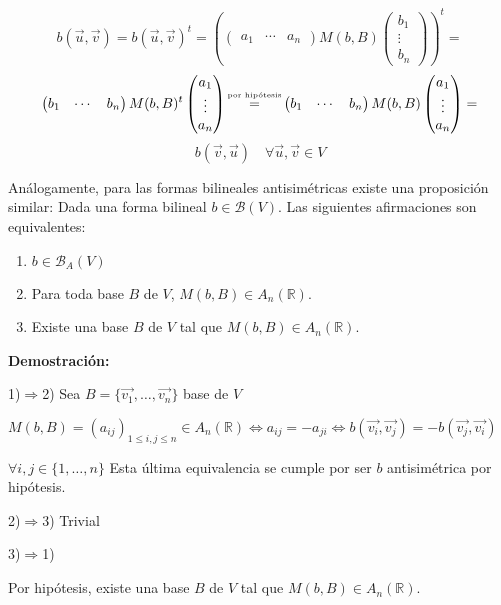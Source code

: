 \documentclass[x11names,table]{report}
\begin{document}
\[b(\vec{u},\vec{v})=b(\vec{u},\vec{v})^t=\left(\begin{pmatrix}
a_1 & \cdots & a_n
\end{pmatrix}M(b,B)\begin{pmatrix}
b_1 \\ \vdots \\ b_n
\end{pmatrix}\right)^t=\]\[\begin{pmatrix}
b_1 & \cdots & b_n
\end{pmatrix}M(b,B)^t\begin{pmatrix}
a_1 \\ \vdots \\ a_n
\end{pmatrix}\shortstack{{\tiny{por hipótesis}}\\=}\begin{pmatrix}
b_1 & \cdots & b_n
\end{pmatrix}M(b,B)\begin{pmatrix}
a_1 \\ \vdots \\ a_n
\end{pmatrix}=\]\[
b(\vec{v},\vec{u})\quad\forall\vec{u},\vec{v}\in V\]

Análogamente, para las formas bilineales antisimétricas existe una proposición similar:
\newpage
Dada una forma bilineal $b\in\mathcal{B}(V)$. Las siguientes afirmaciones son equivalentes:

\begin{enumerate}
\item $b\in\mathcal{B}_A(V)$
\item Para toda base $B$ de $V$, $M(b,B)\in A_n(\mathbb{R})$.
\item Existe una base $B$ de $V$ tal que $M(b,B)\in A_n(\mathbb{R})$.
\end{enumerate}

\textbf{Demostración:}

1)$\Rightarrow$2)
Sea $B=\{\vec{v_1},\dots,\vec{v_n}\}$ base de $V$

$M(b,B)=(a_{ij})_{1\leq i,j \leq n}\in A_n(\mathbb{R})\Leftrightarrow a_{ij}=-a_{ji} \Leftrightarrow b(\vec{v_i},\vec{v_j})=-b(\vec{v_j},\vec{v_i})$

$\forall i,j\in\{1,\dots,n\}$ Esta última equivalencia se cumple por ser $b$ antisimétrica por hipótesis.

2)$\Rightarrow$3) Trivial

3)$\Rightarrow$1)

Por hipótesis, existe una base $B$ de $V$ tal que $M(b,B)\in A_n(\mathbb{R})$. 
\end{document}
